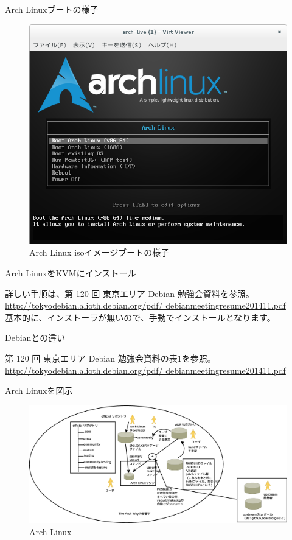 \begin{frame}{Arch Linuxブートの様子}
\begin{figure}[H]
\begin{center}
 \includegraphics[width=0.7\hsize]{image201411/arch-boot.png}
\end{center}
\caption{Arch Linux isoイメージブートの様子}
\end{figure}
\end{frame}

\begin{frame}{Arch LinuxをKVMにインストール}

  詳しい手順は、第 120 回 東京エリア Debian 勉強会資料を参照。\\
  \url{http://tokyodebian.alioth.debian.org/pdf/ debianmeetingresume201411.pdf}\\

  基本的に、インストーラが無いので、手動でインストールとなります。
\end{frame}

\begin{frame}{Debianとの違い}

  第 120 回 東京エリア Debian 勉強会資料の表1を参照。\\
  \url{http://tokyodebian.alioth.debian.org/pdf/ debianmeetingresume201411.pdf}\\

\end{frame}

\begin{frame}{Arch Linuxを図示}
\begin{figure}[H]
\begin{center}
 \includegraphics[width=0.9\hsize]{image201411/arch-schema.eps}
\end{center}
\caption{Arch Linux}
\end{figure}
\end{frame}

